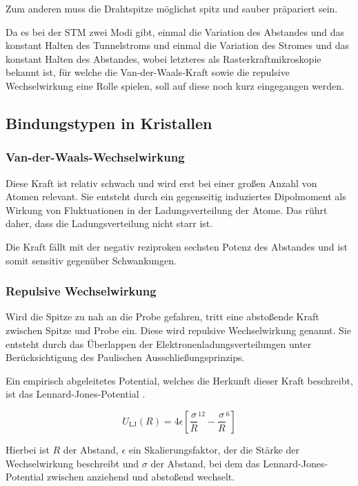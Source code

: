 \noindent Zum anderen muss die Drahtspitze möglichst spitz und sauber präpariert sein.

\noindent Da es bei der STM zwei Modi gibt, einmal die Variation des Abstandes und das konstant Halten des Tunnelstroms und einmal die Variation des Stromes und das konstant Halten des Abstandes, wobei letzteres als Rasterkraftmikroskopie bekannt ist, für welche die Van-der-Waals-Kraft sowie die repulsive Wechselwirkung eine Rolle spielen, soll auf diese noch kurz eingegangen werden.
 
\subsection{Bindungstypen in Kristallen}
\subsubsection{Van-der-Waals-Wechselwirkung}
Diese Kraft ist relativ schwach und wird erst bei einer großen Anzahl von Atomen relevant. Sie entsteht durch ein gegenseitig induziertes Dipolmoment als Wirkung von Fluktuationen in der Ladungsverteilung der Atome. Das rührt daher, dass die Ladungsverteilung nicht starr ist.

\noindent Die Kraft fällt mit der negativ reziproken sechsten Potenz des Abstandes und ist somit sensitiv gegenüber Schwankungen.

\subsubsection{Repulsive Wechselwirkung}
Wird die Spitze zu nah an die Probe gefahren, tritt eine abstoßende Kraft zwischen Spitze und Probe ein. Diese wird repulsive Wechselwirkung genannt. Sie entsteht durch das Überlappen der Elektronenladungsverteilungen unter Berücksichtigung des Paulischen Ausschließungsprinzips.

\noindent Ein empirisch abgeleitetes Potential, welches die Herkunft dieser Kraft beschreibt, ist das Lennard-Jones-Potential \cite{kittel}.

\begin{equation}
U_\text{LJ}(R)=4\epsilon\left[\frac{\sigma}{R}^{12}-\frac{\sigma}{R}^6\right]
\end{equation}

\noindent Hierbei ist \(R\) der Abstand, \(\epsilon\) ein Skalierungsfaktor, der die Stärke der Wechselwirkung beschreibt und \(\sigma\) der Abstand, bei dem das Lennard-Jones-Potential zwischen anziehend und abstoßend wechselt.

